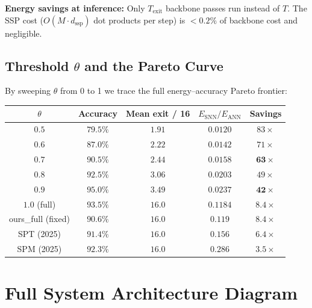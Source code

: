 \documentclass[11pt,a4paper]{article}
\begin{document}
\textbf{Energy savings at inference:} Only $T_\text{exit}$ backbone passes run
instead of $T$.  The SSP cost ($O(M \cdot d_\text{ssp})$ dot products per step)
is $<0.2\%$ of backbone cost and negligible.

\subsection{Threshold $\theta$ and the Pareto Curve}

By sweeping $\theta$ from 0 to 1 we trace the full energy--accuracy
Pareto frontier:
\begin{center}
\begin{tabular}{ccccc}
\toprule
$\theta$ & Accuracy & Mean exit / 16 & $E_\text{SNN}/E_\text{ANN}$ & Savings \\
\midrule
$0.5$ & $79.5\%$ & $1.91$ & $0.0120$ & $83\times$ \\
$0.6$ & $87.0\%$ & $2.22$ & $0.0142$ & $71\times$ \\
$\mathbf{0.7}$ & $\mathbf{90.5\%}$ & $\mathbf{2.44}$ & $\mathbf{0.0158}$ & $\mathbf{63\times}$ \\
$0.8$ & $92.5\%$ & $3.06$ & $0.0203$ & $49\times$ \\
$\mathbf{0.9}$ & $\mathbf{95.0\%}$ & $\mathbf{3.49}$ & $\mathbf{0.0237}$ & $\mathbf{42\times}$ \\
$1.0$ (full) & $93.5\%$ & $16.0$ & $0.1184$ & $8.4\times$ \\
\midrule
ours\_full (fixed) & $90.6\%$ & $16.0$ & $0.119$ & $8.4\times$ \\
SPT (2025) & $91.4\%$ & $16.0$ & $0.156$ & $6.4\times$ \\
SPM (2025) & $92.3\%$ & $16.0$ & $0.286$ & $3.5\times$ \\
\bottomrule
\end{tabular}
\end{center}

\section{Full System Architecture Diagram}
\end{document}
